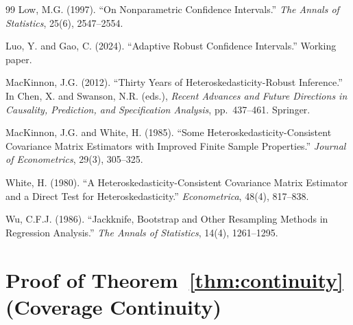 \documentclass[12pt]{article}
\theoremstyle{definition}
\theoremstyle{remark}
\begin{document}
\begin{thebibliography}{99}
Low, M.G. (1997).
\newblock ``On Nonparametric Confidence Intervals.''
\newblock \textit{The Annals of Statistics}, 25(6), 2547--2554.

Luo, Y. and Gao, C. (2024).
\newblock ``Adaptive Robust Confidence Intervals.''
\newblock Working paper.

MacKinnon, J.G. (2012).
\newblock ``Thirty Years of Heteroskedasticity-Robust Inference.''
\newblock In Chen, X. and Swanson, N.R. (eds.), \textit{Recent Advances and Future Directions in Causality, Prediction, and Specification Analysis}, pp.~437--461. Springer.

MacKinnon, J.G. and White, H. (1985).
\newblock ``Some Heteroskedasticity-Consistent Covariance Matrix Estimators with Improved Finite Sample Properties.''
\newblock \textit{Journal of Econometrics}, 29(3), 305--325.

White, H. (1980).
\newblock ``A Heteroskedasticity-Consistent Covariance Matrix Estimator and a Direct Test for Heteroskedasticity.''
\newblock \textit{Econometrica}, 48(4), 817--838.

Wu, C.F.J. (1986).
\newblock ``Jackknife, Bootstrap and Other Resampling Methods in Regression Analysis.''
\newblock \textit{The Annals of Statistics}, 14(4), 1261--1295.

\end{thebibliography}

\newpage

\appendix

\section{Proof of Theorem~\ref{thm:continuity} (Coverage Continuity)}\label{app:thm1}
\end{document}
